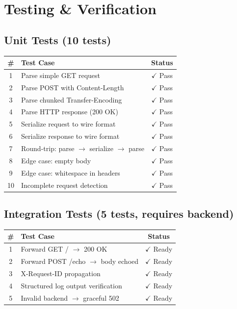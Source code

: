 \documentclass[11pt, a4paper]{article}
\begin{document}
\section{Testing \& Verification}

\subsection{Unit Tests (10 tests)}
\begin{table}[h]
\centering
\begin{tabularx}{\textwidth}{c X c}
\toprule
\textbf{\#} & \textbf{Test Case} & \textbf{Status} \\
\midrule
1 & Parse simple GET request & $\checkmark$ Pass \\
2 & Parse POST with Content-Length & $\checkmark$ Pass \\
3 & Parse chunked Transfer-Encoding & $\checkmark$ Pass \\
4 & Parse HTTP response (200 OK) & $\checkmark$ Pass \\
5 & Serialize request to wire format & $\checkmark$ Pass \\
6 & Serialize response to wire format & $\checkmark$ Pass \\
7 & Round-trip: parse $\rightarrow$ serialize $\rightarrow$ parse & $\checkmark$ Pass \\
8 & Edge case: empty body & $\checkmark$ Pass \\
9 & Edge case: whitespace in headers & $\checkmark$ Pass \\
10 & Incomplete request detection & $\checkmark$ Pass \\
\bottomrule
\end{tabularx}
\end{table}

\subsection{Integration Tests (5 tests, requires backend)}
\begin{table}[h]
\centering
\begin{tabularx}{\textwidth}{c X c}
\toprule
\textbf{\#} & \textbf{Test Case} & \textbf{Status} \\
\midrule
1 & Forward GET / $\rightarrow$ 200 OK & $\checkmark$ Ready \\
2 & Forward POST /echo $\rightarrow$ body echoed & $\checkmark$ Ready \\
3 & X-Request-ID propagation & $\checkmark$ Ready \\
4 & Structured log output verification & $\checkmark$ Ready \\
5 & Invalid backend $\rightarrow$ graceful 502 & $\checkmark$ Ready \\
\bottomrule
\end{tabularx}
\end{table}
\end{document}
